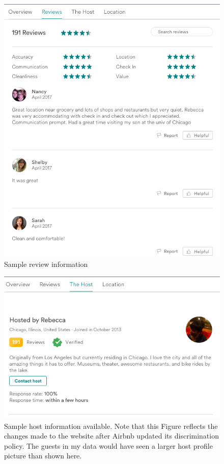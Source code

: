 \begin{figure}\centering
\includegraphics[width=.8\textwidth]{figures/sample3-reviews}
\caption{Sample review information}
\end{figure}
\begin{figure}\centering
\includegraphics[width=.9\textwidth]{figures/sample4-host}
\caption[Sample host information]{Sample host information available. Note that this Figure reflects the changes made to the website after Airbnb updated its discrimination policy. The guests in my data would have seen a larger host profile picture than shown here.}
\end{figure}
